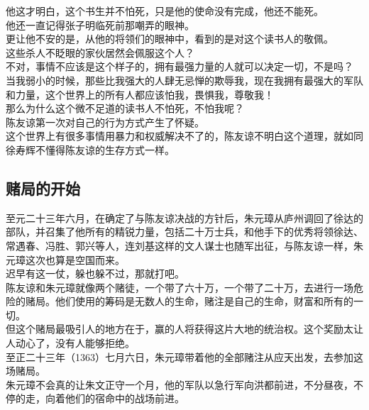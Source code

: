 \begin{multicols}{\theparacolNo}
他这才明白，这个书生并不怕死，只是他的使命没有完成，他还不能死。\\

他还一直记得张子明临死前那嘲弄的眼神。\\

更让他不安的是，从他的将领们的眼神中，看到的是对这个读书人的敬佩。\\

这些杀人不眨眼的家伙居然会佩服这个人？\\

不对，事情不应该是这个样子的，拥有最强力量的人就可以决定一切，不是吗？\\

当我弱小的时候，那些比我强大的人肆无忌惮的欺辱我，现在我拥有最强大的军队和力量，这个世界上的所有人都应该怕我，畏惧我，尊敬我！\\

那么为什么这个微不足道的读书人不怕死，不怕我呢？\\

陈友谅第一次对自己的行为方式产生了怀疑。\\

这个世界上有很多事情用暴力和权威解决不了的，陈友谅不明白这个道理，就如同徐寿辉不懂得陈友谅的生存方式一样。\\

\subsection{赌局的开始}
至元二十三年六月，在确定了与陈友谅决战的方针后，朱元璋从庐州调回了徐达的部队，并召集了他所有的精锐力量，包括二十万士兵，和他手下的优秀将领徐达、常遇春、冯胜、郭兴等人，连刘基这样的文人谋士也随军出征，与陈友谅一样，朱元璋这次也算是空国而来。\\

迟早有这一仗，躲也躲不过，那就打吧。\\

陈友谅和朱元璋就像两个赌徒，一个带了六十万，一个带了二十万，去进行一场危险的赌局。他们使用的筹码是无数人的生命，赌注是自己的生命，财富和所有的一切。\\

但这个赌局最吸引人的地方在于，赢的人将获得这片大地的统治权。这个奖励太让人动心了，没有人能够拒绝。\\

至正二十三年（1363）七月六日，朱元璋带着他的全部赌注从应天出发，去参加这场赌局。\\

朱元璋不会真的让朱文正守一个月，他的军队以急行军向洪都前进，不分昼夜，不停的走，向着他们的宿命中的战场前进。\\


\end{multicols}
